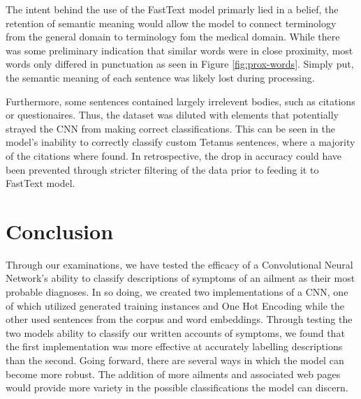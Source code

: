 \documentclass[12pt]{report}
\begin{document}
The intent behind the use of the FastText model primarly lied in
a belief, the retention of semantic meaning would allow the
model to connect terminology from the general domain to
terminology fom the medical domain. While there was some preliminary
indication that similar words were in close proximity, most words
only differed in punctuation as seen in Figure \ref{fig:prox-words}.
Simply put, the semantic meaning of each sentence was likely lost
during processing.

Furthermore, some sentences contained largely irrelevent bodies, such as
citations or questionaires. Thus, the dataset was diluted with elements that
potentially strayed the CNN from making correct classifications. This can be
seen in the model's inability to correctly classify custom Tetanus sentences,
where a majority of the citations where found. In retrospective, the drop
in accuracy could have been prevented through stricter filtering of the data
prior to feeding it to FastText model.


\chapter{Conclusion}

Through our examinations, we have tested the efficacy of a Convolutional Neural
Network's ability to classify descriptions of symptoms of an ailment as their
most probable diagnoses. In so doing, we created two implementations of a CNN,
one of which utilized generated training instances and One Hot Encoding while
the other used sentences from the corpus and word embeddings. Through testing
the two models ability to classify our written accounts of symptoms, we found
that the first implementation was more effective at accurately labelling
descriptions than the second. Going forward, there are several ways in which the
model can become more robust. The addition of more ailments and associated web
pages would provide more variety in the possible classifications the model can
discern.


\end{document}
